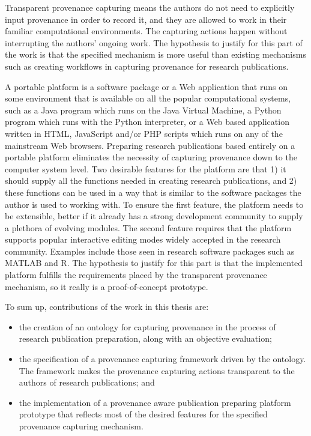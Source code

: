 Transparent provenance capturing means the authors do not need to explicitly input provenance in order to record it, and they are allowed to work in their familiar computational environments. The capturing actions happen without interrupting the authors' ongoing work. The hypothesis to justify for this part of the work is that the specified mechanism is more useful than existing mechanisms such as creating workflows in capturing provenance for research publications.

A portable platform is a software package or a Web application that runs on some environment that is available on all the popular computational systems, such as a Java program which runs on the Java Virtual Machine, a Python program which runs with the Python interpreter, or a Web based application written in HTML, JavaScript and/or PHP scripts which runs on any of the mainstream Web browsers. Preparing research publications based entirely on a portable platform eliminates the necessity of capturing provenance down to the computer system level. Two desirable features for the platform are that 1) it should supply all the functions needed in creating research publications, and 2) these functions can be used in a way that is similar to the software packages the author is used to working with. To ensure the first feature, the platform needs to be extensible, better if it already has a strong development community to supply a plethora of evolving modules. The second feature requires that the platform supports popular interactive editing modes widely accepted in the research community. Examples include those seen in research software packages such as MATLAB and R. The hypothesis to justify for this part is that the implemented platform fulfills the requirements placed by the transparent provenance mechanism, so it really is a proof-of-concept prototype. 

To sum up, contributions of the work in this thesis are:
\begin{itemize}
\item the creation of an ontology for capturing provenance in the process of research publication preparation, along with an objective evaluation;
\item the specification of a provenance capturing framework driven by the ontology. The framework makes the provenance capturing actions transparent to the authors of research publications; and 
\item the implementation of a provenance aware publication preparing platform prototype that reflects most of the desired features for the specified provenance capturing mechanism.
\end{itemize}

